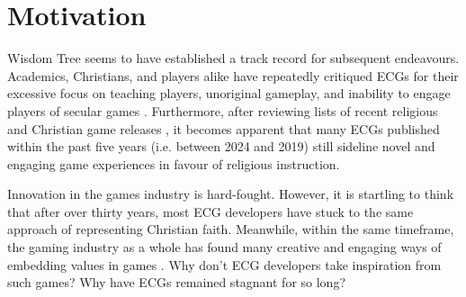 \section{Motivation} %

Wisdom Tree seems to have established a track record for subsequent endeavours. Academics, Christians, and players alike have repeatedly critiqued \acp{ECG} for their excessive focus on teaching players, unoriginal gameplay, and inability to engage players of secular games \parencite{bogost_persuasive_2007, schut_making_2013, moon_channel_why_2023, innocentbystander_why_2009}. Furthermore, after reviewing lists of recent religious and Christian game releases \parencite{gonzalez_religious_2022, noauthor_list_2024}, it becomes apparent that many \acp{ECG} published within the past five years (i.e. between 2024 and 2019) still sideline novel and engaging game experiences in favour of religious instruction.%









Innovation in the games industry is hard-fought. However, it is startling to think that after over thirty years, most \ac{ECG} developers have stuck to the same approach of representing Christian faith. Meanwhile, within the same timeframe, the gaming industry as a whole has found many creative and engaging ways of embedding values in games \parencite{bogost_persuasive_2007, flanagan_values_2014}. Why don't \ac{ECG} developers take inspiration from such games? Why have \acp{ECG} remained stagnant for so long?

